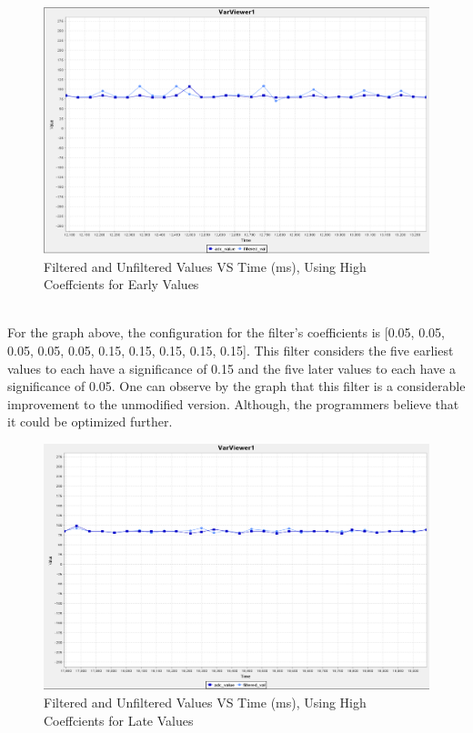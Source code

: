 \documentclass[12pt]{report}
\begin{document}
\begin{figure}[h] %
	\label{Linear Graph of the Filtered and Unfiltered Values Plotted Against Time}
	\begin{center}
		\includegraphics[scale=0.5]{./figures/adc_10coeffs_early_high_values.PNG}
		\caption{Filtered and Unfiltered Values VS Time (ms), Using High Coeffcients for Early Values}
	\end{center}
\end{figure}
\\For the graph above, the configuration for the filter's coefficients is [0.05, 0.05, 0.05, 0.05, 0.05, 0.15, 0.15, 0.15, 0.15, 0.15]. This filter considers the five earliest values to each have a significance of 0.15 and the five later values to each have a significance of 0.05. One can observe by the graph that this filter is a considerable improvement to the unmodified version. Although, the programmers believe that it could be optimized further.
\begin{figure}[h] %
	\label{Linear Graph of the Filtered and Unfiltered Values Plotted Against Time}
	\begin{center}
		\includegraphics[scale=0.5]{./figures/adc_10coeffs_late_high_values.PNG}
		\caption{Filtered and Unfiltered Values VS Time (ms), Using High Coeffcients for Late Values}
	\end{center}
\end{figure}
\end{document}
